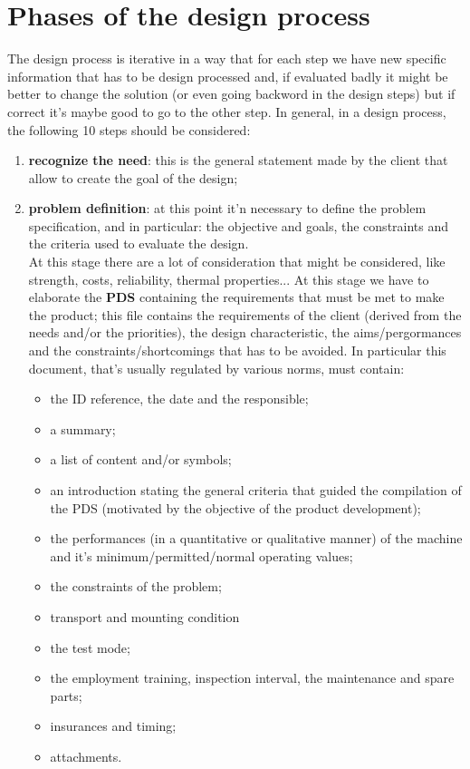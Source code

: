 \section{Phases of the design process}
	The design process is iterative in a way that for each step we have new specific information that has to be design processed and, if evaluated badly it might be better to change the solution (or even going backword in the design steps) but if correct it's maybe good to go to the other step. In general, in a design process, the following 10 steps should be considered:
	\begin{enumerate}
		\item \textbf{recognize the need}: this is the general statement made by the client that allow to create the goal of the design;
		
		\item  \textbf{problem definition}: at this point it'n necessary to define the problem specification, and in particular: the objective and goals, the constraints and the criteria used to evaluate the design.\\
		At this stage there are a lot of consideration that might be considered, like strength, costs, reliability, thermal properties... At this stage we have to elaborate the  \textbf{PDS} containing the requirements that must be met to make the product; this file contains the requirements of the client (derived from the needs and/or the priorities), the design characteristic, the aims/pergormances and the constraints/shortcomings that has to be avoided. In particular this document, that's usually regulated by various norms, must contain:
		\begin{multicols}{2}
			\begin{itemize}
				\item the ID reference, the date and the responsible;
				\item a summary;
				\item a list of content and/or symbols;
				\item an introduction stating the general criteria that guided the compilation of the PDS (motivated by the objective of the product development);
				\item the performances (in a quantitative or qualitative manner) of the machine and it's minimum/permitted/normal operating values;
				\item the constraints of the problem;
				\item transport and mounting condition
				\item the test mode;
				\item the employment training, inspection interval, the maintenance and spare parts;
				\item insurances and timing;
				\item attachments.
			\end{itemize}
		\end{multicols}
	

\end{enumerate}
